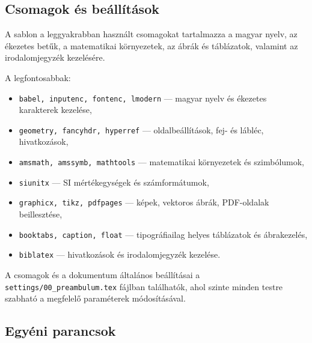 \documentclass[fleqn,12pt]{article}
\begin{document}
    
    \subsection{Csomagok és beállítások}

       A sablon a leggyakrabban használt csomagokat tartalmazza a magyar nyelv, az ékezetes betűk, a matematikai környezetek, az ábrák és táblázatok, valamint az irodalomjegyzék kezelésére. 

       \vspace{1em}
       A legfontosabbak:
        \begin{itemize}
            \item \texttt{babel, inputenc, fontenc, lmodern} — magyar nyelv és ékezetes karakterek kezelése,
            \item \texttt{geometry, fancyhdr, hyperref} — oldalbeállítások, fej- és lábléc, hivatkozások,
            \item \texttt{amsmath, amssymb, mathtools} — matematikai környezetek és szimbólumok,
            \item \texttt{siunitx} — SI mértékegységek és számformátumok,
            \item \texttt{graphicx, tikz, pdfpages} — képek, vektoros ábrák, PDF-oldalak beillesztése,
            \item \texttt{booktabs, caption, float} — tipográfiailag helyes táblázatok és ábrakezelés,
            \item \texttt{biblatex} — hivatkozások és irodalomjegyzék kezelése.
        \end{itemize}

        A csomagok és a dokumentum általános beállításai a  \texttt{settings/00\_preambulum.tex} fájlban találhatók,  ahol szinte minden testre szabható a megfelelő paraméterek módosításával.

    \subsection{Egyéni parancsok}
\end{document}

